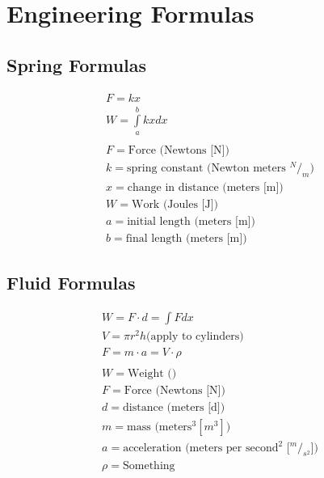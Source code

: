 \documentclass[12pt, letterpaper]{article}
\begin{document}
\section{Engineering Formulas}
\subsection{Spring Formulas}
\begin{gather*}
F = kx\\
W = \int\limits _a^b kx dx\\
\\
F = \text{Force (Newtons [N])}\\
k = \text{spring constant (Newton meters $^N/_m$)}\\
x = \text{change in distance (meters [m])}\\
W = \text{Work (Joules [J])}\\
a = \text{initial length (meters [m])}\\
b = \text{final length (meters [m])}
\end{gather*}

\subsection{Fluid Formulas}
\begin{gather*}
W = F \cdot d = \int\limits F dx\\
V = \pi r^2 h \text{(apply to cylinders)}\\
F = m \cdot a = V \cdot \rho\\
\\
W = \text{Weight ()}\\
F = \text{Force (Newtons [N])}\\
d = \text{distance (meters [d])}\\
m = \text{mass (meters$^3 [m^3]$)}\\
a = \text{acceleration (meters per second$^2$ [$^m/_{s^2}$])}\\
\rho = \text{Something}
\end{gather*}
\end{document}
